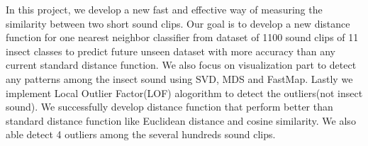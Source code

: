 In this project, we develop a new fast and effective way of measuring the similarity between two short sound clips. Our goal is to develop a new distance function for one nearest neighbor classifier from dataset of 1100 sound clips of 11 insect classes to predict future unseen dataset with more accuracy than any current standard distance function. We also focus on visualization part to detect any patterns among the insect sound using SVD, MDS and FastMap. Lastly we implement Local Outlier Factor(LOF) alogorithm to detect the outliers(not insect sound). We successfully develop distance function that perform better than standard distance function like Euclidean distance and cosine similarity. We also able detect 4 outliers among the several hundreds sound clips.   


